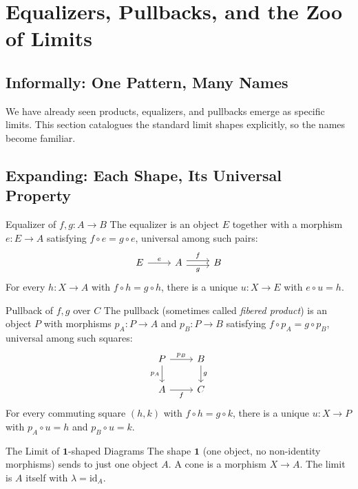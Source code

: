 \section{Equalizers, Pullbacks, and the Zoo of Limits}
\label{sec:limit-zoo}

\subsection{Informally: One Pattern, Many Names}

We have already seen products, equalizers, and pullbacks emerge as
specific limits. This section catalogues the standard limit shapes
explicitly, so the names become familiar.

\subsection{Expanding: Each Shape, Its Universal Property}

\begin{example}{Equalizer of $f, g : A \to B$}
The equalizer is an object $E$ together with a morphism $e : E \to A$
satisfying $f \circ e = g \circ e$, universal among such pairs:
\[
\begin{tikzcd}
  E \arrow[r, "e"] & A \arrow[r, shift left, "f"] \arrow[r, shift right, "g"'] & B
\end{tikzcd}
\]
For every $h : X \to A$ with $f \circ h = g \circ h$, there is a unique
$u : X \to E$ with $e \circ u = h$.
\end{example}

\begin{example}{Pullback of $f, g$ over $C$}
The pullback (sometimes called \emph{fibered product}) is an object $P$
with morphisms $p_A : P \to A$ and $p_B : P \to B$ satisfying
$f \circ p_A = g \circ p_B$, universal among such squares:
\[
\begin{tikzcd}
  P \arrow[r, "p_B"] \arrow[d, "p_A"'] & B \arrow[d, "g"] \\
  A \arrow[r, "f"'] & C
\end{tikzcd}
\]
For every commuting square $(h, k)$ with $f \circ h = g \circ k$, there
is a unique $u : X \to P$ with $p_A \circ u = h$ and $p_B \circ u = k$.
\end{example}

\begin{example}{The Limit of $\mathbf{1}$-shaped Diagrams}
The shape $\mathbf{1}$ (one object, no non-identity morphisms) sends to
just one object $A$. A cone is a morphism $X \to A$. The limit is $A$
itself with $\lambda = \mathrm{id}_A$.
\end{example}

